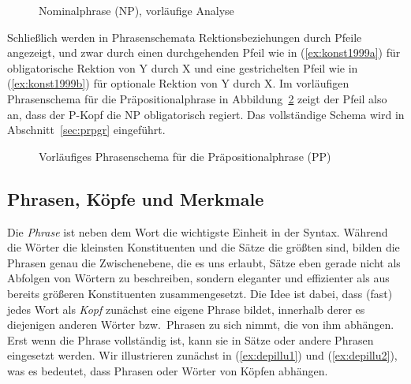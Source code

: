\begin{figure}[!htbp]
  \centering
  \caption{Nominalphrase (NP), vorläufige Analyse}
  \label{fig:vnflach}
\end{figure}

Schließlich werden in Phrasenschemata Rektionsbeziehungen durch Pfeile angezeigt, und zwar durch einen durchgehenden Pfeil wie in (\ref{ex:konst1999a}) für obligatorische Rektion von Y durch X und eine gestrichelten Pfeil wie in (\ref{ex:konst1999b}) für optionale Rektion von Y durch X.
Im vorläufigen Phrasenschema für die Präpositionalphrase in Abbildung~\ref{fig:strschembsprek} zeigt der Pfeil also \zB an, dass der P-Kopf die NP obligatorisch regiert.
Das vollständige Schema wird in Abschnitt~\ref{sec:prpgr} eingeführt.

\begin{exe}
  \ex\label{ex:konst1999} 
  \begin{xlist}
  \end{xlist}
\end{exe}

\begin{figure}[!htbp]
  \centering
  \colorbox{lightgray}{
  }
  \caption{Vorläufiges Phrasenschema für die Präpositionalphrase (PP)}
  \label{fig:strschembsprek}
\end{figure}

\subsection{Phrasen, Köpfe und Merkmale}

\label{sec:koepfevalenzmaximalitaet}

Die \textit{Phrase} ist neben dem Wort die wichtigste Einheit in der Syntax.
Während die Wörter die kleinsten Konstituenten und die Sätze die größten sind, bilden die Phrasen genau die Zwischenebene, die es uns erlaubt, Sätze eben gerade nicht als Abfolgen von Wörtern zu beschreiben,
sondern eleganter und effizienter als aus bereits größeren Konstituenten zusammengesetzt.
Die Idee ist dabei, dass (fast) jedes Wort als \textit{Kopf} zunächst eine eigene Phrase bildet, innerhalb derer es diejenigen anderen Wörter bzw.\ Phrasen zu sich nimmt, die von ihm abhängen.
Erst wenn die Phrase vollständig ist, kann sie in Sätze oder andere Phrasen eingesetzt werden.
Wir illustrieren zunächst in (\ref{ex:depillu1}) und (\ref{ex:depillu2}), was es bedeutet, dass Phrasen oder Wörter von Köpfen abhängen.

